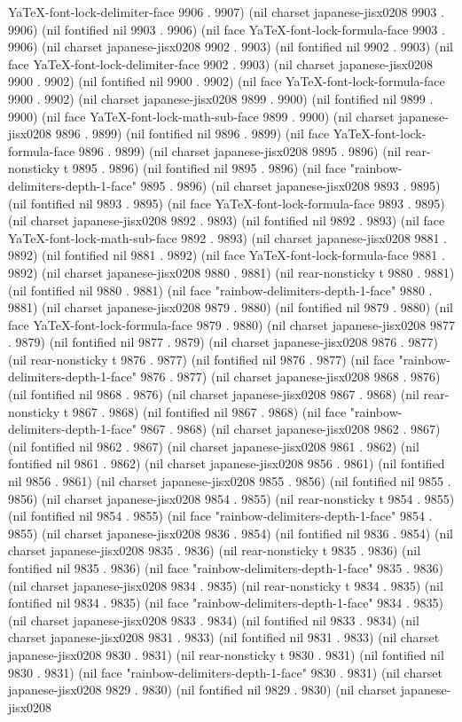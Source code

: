 YaTeX-font-lock-delimiter-face 9906 . 9907) (nil charset japanese-jisx0208 9903 . 9906) (nil fontified nil 9903 . 9906) (nil face YaTeX-font-lock-formula-face 9903 . 9906) (nil charset japanese-jisx0208 9902 . 9903) (nil fontified nil 9902 . 9903) (nil face YaTeX-font-lock-delimiter-face 9902 . 9903) (nil charset japanese-jisx0208 9900 . 9902) (nil fontified nil 9900 . 9902) (nil face YaTeX-font-lock-formula-face 9900 . 9902) (nil charset japanese-jisx0208 9899 . 9900) (nil fontified nil 9899 . 9900) (nil face YaTeX-font-lock-math-sub-face 9899 . 9900) (nil charset japanese-jisx0208 9896 . 9899) (nil fontified nil 9896 . 9899) (nil face YaTeX-font-lock-formula-face 9896 . 9899) (nil charset japanese-jisx0208 9895 . 9896) (nil rear-nonsticky t 9895 . 9896) (nil fontified nil 9895 . 9896) (nil face "rainbow-delimiters-depth-1-face" 9895 . 9896) (nil charset japanese-jisx0208 9893 . 9895) (nil fontified nil 9893 . 9895) (nil face YaTeX-font-lock-formula-face 9893 . 9895) (nil charset japanese-jisx0208 9892 . 9893) (nil fontified nil 9892 . 9893) (nil face YaTeX-font-lock-math-sub-face 9892 . 9893) (nil charset japanese-jisx0208 9881 . 9892) (nil fontified nil 9881 . 9892) (nil face YaTeX-font-lock-formula-face 9881 . 9892) (nil charset japanese-jisx0208 9880 . 9881) (nil rear-nonsticky t 9880 . 9881) (nil fontified nil 9880 . 9881) (nil face "rainbow-delimiters-depth-1-face" 9880 . 9881) (nil charset japanese-jisx0208 9879 . 9880) (nil fontified nil 9879 . 9880) (nil face YaTeX-font-lock-formula-face 9879 . 9880) (nil charset japanese-jisx0208 9877 . 9879) (nil fontified nil 9877 . 9879) (nil charset japanese-jisx0208 9876 . 9877) (nil rear-nonsticky t 9876 . 9877) (nil fontified nil 9876 . 9877) (nil face "rainbow-delimiters-depth-1-face" 9876 . 9877) (nil charset japanese-jisx0208 9868 . 9876) (nil fontified nil 9868 . 9876) (nil charset japanese-jisx0208 9867 . 9868) (nil rear-nonsticky t 9867 . 9868) (nil fontified nil 9867 . 9868) (nil face "rainbow-delimiters-depth-1-face" 9867 . 9868) (nil charset japanese-jisx0208 9862 . 9867) (nil fontified nil 9862 . 9867) (nil charset japanese-jisx0208 9861 . 9862) (nil fontified nil 9861 . 9862) (nil charset japanese-jisx0208 9856 . 9861) (nil fontified nil 9856 . 9861) (nil charset japanese-jisx0208 9855 . 9856) (nil fontified nil 9855 . 9856) (nil charset japanese-jisx0208 9854 . 9855) (nil rear-nonsticky t 9854 . 9855) (nil fontified nil 9854 . 9855) (nil face "rainbow-delimiters-depth-1-face" 9854 . 9855) (nil charset japanese-jisx0208 9836 . 9854) (nil fontified nil 9836 . 9854) (nil charset japanese-jisx0208 9835 . 9836) (nil rear-nonsticky t 9835 . 9836) (nil fontified nil 9835 . 9836) (nil face "rainbow-delimiters-depth-1-face" 9835 . 9836) (nil charset japanese-jisx0208 9834 . 9835) (nil rear-nonsticky t 9834 . 9835) (nil fontified nil 9834 . 9835) (nil face "rainbow-delimiters-depth-1-face" 9834 . 9835) (nil charset japanese-jisx0208 9833 . 9834) (nil fontified nil 9833 . 9834) (nil charset japanese-jisx0208 9831 . 9833) (nil fontified nil 9831 . 9833) (nil charset japanese-jisx0208 9830 . 9831) (nil rear-nonsticky t 9830 . 9831) (nil fontified nil 9830 . 9831) (nil face "rainbow-delimiters-depth-1-face" 9830 . 9831) (nil charset japanese-jisx0208 9829 . 9830) (nil fontified nil 9829 . 9830) (nil charset japanese-jisx0208 